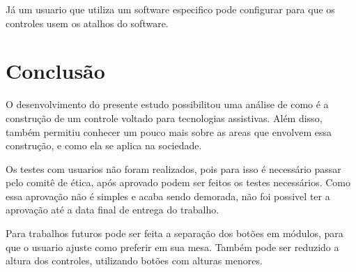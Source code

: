 \documentclass[
	12pt,			%
	openright,		%
	oneside,			%
	a4paper,			%
	chapter=TITLE,		%
	english,			%
	brazil,			%
	]{abntex2}
\begin{document}
Já um usuario que utiliza um software especifico pode configurar para que os controles usem os atalhos do software.

\chapter{Conclusão}

O desenvolvimento do presente estudo possibilitou uma análise de como é a construção de um controle voltado para tecnologias assistivas. Além disso, também permitiu conhecer um pouco mais sobre as areas que envolvem essa construção, e como ela se aplica na sociedade.

Os testes com usuarios não foram realizados, pois para isso é necessário passar pelo comitê de ética, após aprovado podem ser feitos os testes necessários. Como essa aprovação não é simples e acaba sendo demorada, não foi possivel ter a aprovação até a data final de entrega do trabalho.

Para trabalhos futuros pode ser feita a separação dos botões em módulos, para que o usuario ajuste como preferir em sua mesa. Também pode ser reduzido a altura dos controles, utilizando botões com alturas menores.

%






\postextual


%





%
%
\end{document}
